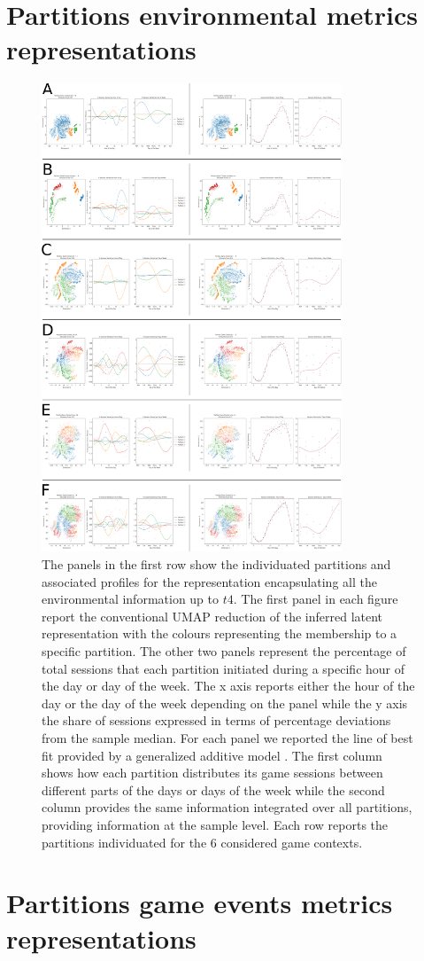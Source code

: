 \section{Partitions environmental metrics representations}
\label{partitions_environmental}

\begin{figure}[ht]
\includegraphics[width=0.8\textwidth]{images/appendix_D/clust_env_all.png}
\centering
\caption[Partitions of the representations generated by the RNN architectures from the environmental metrics]{The panels in the first row show the individuated partitions and associated profiles for the representation encapsulating all the environmental information up to $t4$. The first panel in each figure report the conventional UMAP reduction of the inferred latent representation with the colours representing the membership to a specific partition. The other two panels represent the percentage of total sessions that each partition initiated during a specific hour of the day or day of the week. The x axis reports either the hour of the day or the day of the week depending on the panel while the y axis the share of sessions expressed in terms of percentage deviations from the sample median. For each panel we reported the line of best fit provided by a generalized additive model \cite{serven2018}. The first column shows how each partition distributes its game sessions between different parts of the days or days of the week while the second column provides the same information integrated over all partitions, providing information at the sample level. Each row reports the partitions individuated for the 6 considered game contexts.}
\label{partition_rnn_env} 
\end{figure}
\FloatBarrier

\section{Partitions game events metrics representations}
\label{partitions_game_events}